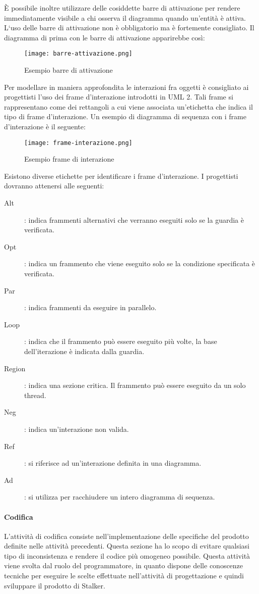 \documentclass[../../norme-di-progetto.tex]{subfiles}
\begin{document}
È possibile inoltre utilizzare delle cosiddette barre di attivazione per rendere immediatamente visibile a chi osserva il diagramma quando un'entità è attiva.
L`uso delle barre di attivazione non è obbligatorio ma è fortemente consigliato.
Il diagramma di prima con le barre di attivazione apparirebbe così:
\begin{figure}[H]%
  \label{fig:barre_attivazione}
  \texttt{[image: barre-attivazione.png]}
  \centering
  \caption{Esempio barre di attivazione}
\end{figure}
Per modellare in maniera approfondita le interazioni fra oggetti è consigliato ai progettisti l'uso dei frame d'interazione introdotti in UML 2.
Tali frame si rappresentano come dei rettangoli a cui viene associata un'etichetta che indica il tipo di frame d'interazione.
Un esempio di diagramma di sequenza con i frame d'interazione è il seguente:
\begin{figure}[H]%
  \label{fig:frame_di_interazione}
  \texttt{[image: frame-interazione.png]}
  \centering
  \caption{Esempio frame di interazione}
\end{figure}
Esistono diverse etichette per identificare i frame d'interazione. I progettisti dovranno attenersi alle seguenti:
\begin{description}
  \item [Alt]: indica frammenti alternativi che verranno eseguiti solo se la guardia è verificata.
  \item [Opt]: indica un frammento che viene eseguito solo se la condizione specificata è verificata.
  \item [Par]: indica frammenti da eseguire in parallelo.
  \item [Loop]: indica che il frammento può essere eseguito più volte, la base dell'iterazione è indicata dalla guardia.
  \item [Region]: indica una sezione critica. Il frammento può essere eseguito da un solo thread.
  \item [Neg]: indica un'interazione non valida.
  \item [Ref]: si riferisce ad un'interazione definita in una diagramma.
  \item [Ad]: si utilizza per racchiudere un intero diagramma di sequenza.
\end{description}

\paragraph{Codifica}%
\label{par:codifica}
L'attività di codifica consiste nell'implementazione delle specifiche del prodotto definite nelle attività precedenti.
Questa sezione ha lo scopo di evitare qualsiasi tipo di inconsistenza e rendere il codice più omogeneo possibile.
Questa attività viene svolta dal ruolo del programmatore, in quanto dispone delle conoscenze tecniche per eseguire le scelte effettuate nell'attività di progettazione e quindi sviluppare il prodotto di Stalker.
\end{document}
